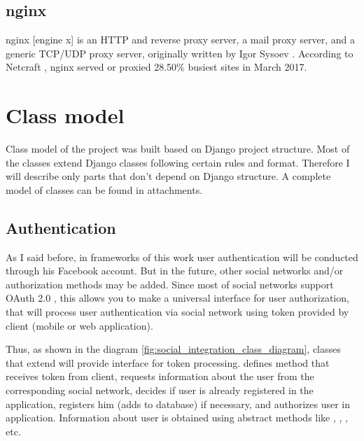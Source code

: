 \subsection{nginx}
nginx [engine x] is an HTTP and reverse proxy server, a mail proxy server, and a generic TCP/UDP proxy server,
originally written by Igor Sysoev \cite{nginx}. According to Netcraft \cite{netcraft}, nginx served or proxied 28.50\%
busiest sites in March 2017.


\section{Class model}
Class model of the project was built based on Django project structure. Most of the classes extend Django classes
following certain rules and format. Therefore I will describe only parts that don't depend on Django structure.
A complete model of classes can be found in attachments.

\subsection{Authentication}
As I said before, in frameworks of this work user authentication will be conducted through his Facebook account. But
in the future, other social networks and/or authorization methods may be added. Since most of social networks support
OAuth 2.0 \cite{oauth}, this allows you to make a universal interface for user authorization, that will process
user authentication via social network using token provided by client (mobile or web application).

Thus, as shown in the diagram \ref{fig:social_integration_class_diagram}, classes that extend 
will provide interface for token processing.  defines method  that receives
token from client, requests information about the user from the corresponding social network, decides if user is already
registered in the application, registers him (adds to database) if necessary, and authorizes user in application.
Information about user is obtained using abstract methods like , ,
, etc.



